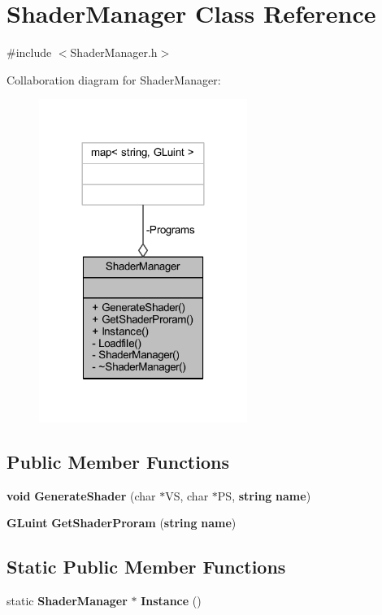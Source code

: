 \section{Shader\+Manager Class Reference}
\label{class_shader_manager}


{\ttfamily \#include $<$Shader\+Manager.\+h$>$}



Collaboration diagram for Shader\+Manager\+:\nopagebreak
\begin{figure}[H]
\begin{center}
\leavevmode
\includegraphics[width=192pt]{dd/d46/class_shader_manager__coll__graph}
\end{center}
\end{figure}
\subsection*{Public Member Functions}
\begin{DoxyCompactItemize}
\item 
{\bf void} {\bf Generate\+Shader} (char $\ast$V\+S, char $\ast$P\+S, {\bf string} {\bf name})
\item 
{\bf G\+Luint} {\bf Get\+Shader\+Proram} ({\bf string} {\bf name})
\end{DoxyCompactItemize}
\subsection*{Static Public Member Functions}
\begin{DoxyCompactItemize}
\item 
static {\bf Shader\+Manager} $\ast$ {\bf Instance} ()
\end{DoxyCompactItemize}

